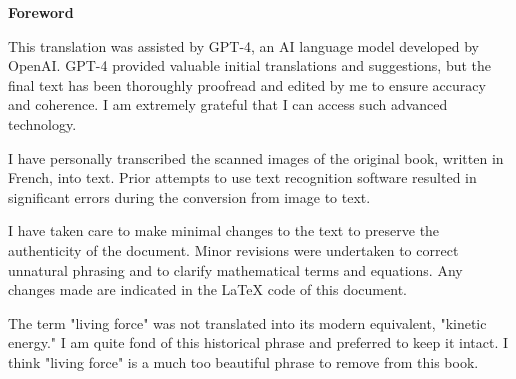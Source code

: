 \documentclass{book}
\makeatletter
\newcommand{\booksubtitle}{CONSIDERATIONS ON THE USE OF ENGINES AND THEIR EVALUATION, 
TO SERVE AS AN INTRODUCTION TO THE SPECIAL STUDY OF MACHINES}
\newcommand{\bookauthor}{\@author}
\makeatother
\begin{document}









\thispagestyle{empty}
\newpage
\vspace*{\fill}
\textbf{Foreword}
\setlength{\parindent}{20pt}
\vfill

This translation was assisted by GPT-4, an AI language model developed by OpenAI. GPT-4 provided valuable initial translations and suggestions, but the final text has been thoroughly proofread and edited by me to ensure accuracy and coherence. I am extremely grateful that I can access such advanced technology.

I have personally transcribed the scanned images of the original book, written in French, into text. Prior attempts to use text recognition software resulted in significant errors during the conversion from image to text. 

I have taken care to make minimal changes to the text to preserve the authenticity of the document. Minor revisions were undertaken to correct unnatural phrasing and to clarify mathematical terms and equations. Any changes made are indicated in the LaTeX code of this document.

The term "living force" was not translated into its modern equivalent, "kinetic energy." I am quite fond of this historical phrase and preferred to keep it intact. I think "living force" is a much too beautiful phrase to remove from this book. 
\end{document}
